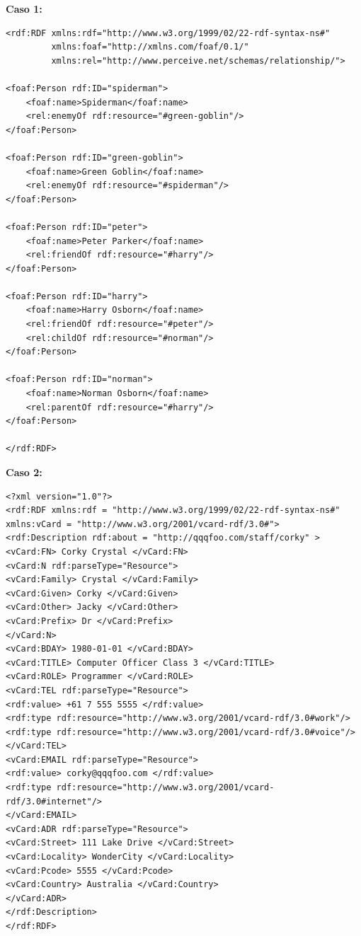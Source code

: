 \documentclass[a4paper,12pt,twoside,final,spanish]{article}
\begin{document}
\textbf{Caso 1:}
\begin{lstlisting}
<rdf:RDF xmlns:rdf="http://www.w3.org/1999/02/22-rdf-syntax-ns#"
         xmlns:foaf="http://xmlns.com/foaf/0.1/"
         xmlns:rel="http://www.perceive.net/schemas/relationship/">
         
<foaf:Person rdf:ID="spiderman">
	<foaf:name>Spiderman</foaf:name>   
   	<rel:enemyOf rdf:resource="#green-goblin"/>
</foaf:Person>

<foaf:Person rdf:ID="green-goblin">
	<foaf:name>Green Goblin</foaf:name>
   	<rel:enemyOf rdf:resource="#spiderman"/>
</foaf:Person> 

<foaf:Person rdf:ID="peter">
	<foaf:name>Peter Parker</foaf:name>
   	<rel:friendOf rdf:resource="#harry"/>
</foaf:Person>

<foaf:Person rdf:ID="harry">
	<foaf:name>Harry Osborn</foaf:name>
   	<rel:friendOf rdf:resource="#peter"/>
   	<rel:childOf rdf:resource="#norman"/>
</foaf:Person>

<foaf:Person rdf:ID="norman">
 	<foaf:name>Norman Osborn</foaf:name>
   	<rel:parentOf rdf:resource="#harry"/>   
</foaf:Person>
 
</rdf:RDF>
\end{lstlisting}

\textbf{Caso 2:}
\begin{lstlisting}
<?xml version="1.0"?> 
<rdf:RDF xmlns:rdf = "http://www.w3.org/1999/02/22-rdf-syntax-ns#" 
xmlns:vCard = "http://www.w3.org/2001/vcard-rdf/3.0#">  
<rdf:Description rdf:about = "http://qqqfoo.com/staff/corky" > 
<vCard:FN> Corky Crystal </vCard:FN> 
<vCard:N rdf:parseType="Resource"> 
<vCard:Family> Crystal </vCard:Family> 
<vCard:Given> Corky </vCard:Given> 
<vCard:Other> Jacky </vCard:Other> 
<vCard:Prefix> Dr </vCard:Prefix> 
</vCard:N> 
<vCard:BDAY> 1980-01-01 </vCard:BDAY> 
<vCard:TITLE> Computer Officer Class 3 </vCard:TITLE> 
<vCard:ROLE> Programmer </vCard:ROLE> 
<vCard:TEL rdf:parseType="Resource"> 
<rdf:value> +61 7 555 5555 </rdf:value> 
<rdf:type rdf:resource="http://www.w3.org/2001/vcard-rdf/3.0#work"/> 
<rdf:type rdf:resource="http://www.w3.org/2001/vcard-rdf/3.0#voice"/> 
</vCard:TEL> 
<vCard:EMAIL rdf:parseType="Resource"> 
<rdf:value> corky@qqqfoo.com </rdf:value> 
<rdf:type rdf:resource="http://www.w3.org/2001/vcard-rdf/3.0#internet"/> 
</vCard:EMAIL> 
<vCard:ADR rdf:parseType="Resource"> 
<vCard:Street> 111 Lake Drive </vCard:Street> 
<vCard:Locality> WonderCity </vCard:Locality> 
<vCard:Pcode> 5555 </vCard:Pcode> 
<vCard:Country> Australia </vCard:Country> 
</vCard:ADR> 
</rdf:Description> 
</rdf:RDF> 
\end{lstlisting}
\end{document}
